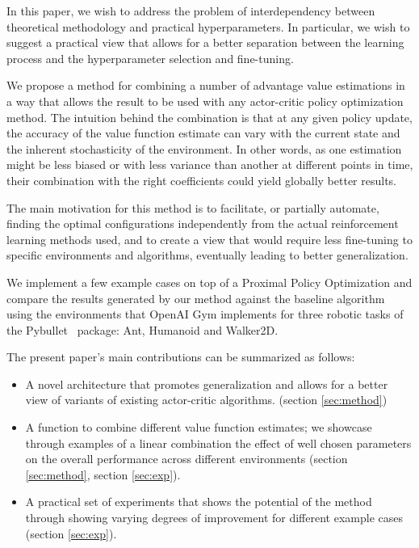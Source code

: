 In this paper, we wish to address the problem of interdependency between theoretical methodology and practical hyperparameters. In particular, we wish to suggest a practical view that allows for a better separation between the learning process and the hyperparameter selection and fine-tuning. 

We propose a method for combining a number of advantage value estimations in a way that allows the result to be used with any actor-critic policy optimization method. The intuition behind the combination is that at any given policy update, the accuracy of the value function estimate can vary with the current state and the inherent stochasticity of the environment. In other words, as one estimation might be less biased or with less variance than another at different points in time, their combination with the right coefficients could yield globally better results. 

The main motivation for this method is to facilitate, or partially automate, finding the optimal configurations independently from the actual reinforcement learning methods used, and to create a view that would require less fine-tuning to specific environments and algorithms, eventually leading to better generalization.

We implement a few example cases on top of a Proximal Policy Optimization \cite{schulman2017proximal} and compare the results generated by our method against the baseline algorithm using the environments that OpenAI Gym \cite{brockman2016openai} implements for three robotic tasks of the Pybullet \cite{coumans2019pybullet} package: Ant, Humanoid and Walker2D.

The present paper's main contributions can be summarized as follows:
\begin{itemize}
\item A novel architecture that promotes generalization and allows for a better view of variants of existing actor-critic algorithms. (section \ref{sec:method})
\item A function to combine different value function estimates; we showcase through examples of a linear combination the effect of well chosen parameters on the overall performance across different environments (section \ref{sec:method}, section \ref{sec:exp}).
\item A practical set of experiments that shows the potential of the method through showing varying degrees of improvement for different example cases (section \ref{sec:exp}). 
\end{itemize}

